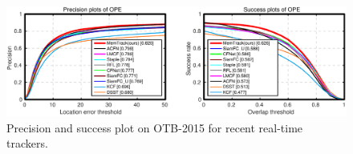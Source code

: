 \documentclass[runningheads]{llncs}
\begin{document}
\begin{figure}[t]
	\begin{center}
		\includegraphics[width=0.85\linewidth]{figs/realtime-tb100.pdf}
	\end{center}
	\caption{Precision and success plot on OTB-2015 for recent real-time trackers.}
	\label{fig:9}
\end{figure}
\end{document}
